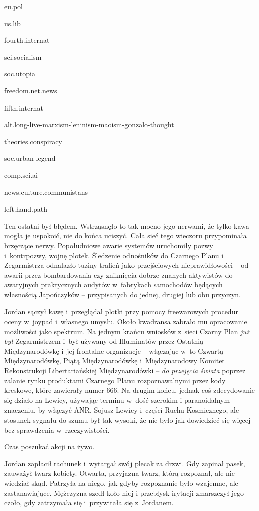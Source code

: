 \documentclass[oneside,polish,11pt,sfheadings]{mwbk}
\begin{document}
eu.pol

us.lib

fourth.internat

sci.socialism

soc.utopia

freedom.net.news

fifth.internat

alt.long-live-marxism-leninism-maoism-gonzalo-thought

theories.conspiracy

soc.urban-legend

comp.sci.ai

news.culture.communistans

left.hand.path

Ten ostatni był błędem. Wstrząsnęło to tak mocno jego nerwami, że tylko
kawa mogła je uspokoić, nie do końca uciszyć. Cała sieć tego wieczoru
przypominała brzęczące nerwy. Popołudniowe awarie systemów uruchomiły
pozwy i~kontrpozwy, wojnę plotek. Śledzenie odnośników do Czarnego Planu
i Zegarmistrza odnalazło tuziny trafień jako przejściowych
nieprawidłowości -- od awarii przez bombardowania czy zniknięcia dobrze
znanych aktywistów do awaryjnych praktycznych audytów w~fabrykach
samochodów będących własnością Japończyków -- przypisanych do jednej,
drugiej lub obu przyczyn.

Jordan sączył kawę i~przeglądał plotki przy pomocy freewarowych procedur
oceny w~joypad i~własnego umysłu. Około kwadransa zabrało mu opracowanie
możliwości jako spektrum. Na jednym krańcu wniosków z~sieci Czarny Plan
\emph{już był} Zegarmistrzem i~był używany od Illuminatów przez Ostatnią
Międzynarodówkę i~jej frontalne organizacje -- włączając w~to Czwartą
Międzynarodówkę, Piątą Międzynarodówkę i~Międzynarodowy Komitet
Rekonstrukcji Libertariańskiej Międzynarodówki -- \emph{do przejęcia
świata} poprzez zalanie rynku produktami Czarnego Planu rozpoznawalnymi
przez kody kreskowe, które zawierały numer 666. Na drugim końcu, jednak
coś zdecydowanie się działo na Lewicy, używając terminu w~dość szerokim
i paranoidalnym znaczeniu, by włączyć ANR, Sojusz Lewicy i~części Ruchu
Kosmicznego, ale stosunek sygnału do szumu był tak wysoki, że nie było
jak dowiedzieć się więcej bez sprawdzenia w~rzeczywistości.

Czas poszukać akcji na żywo.

Jordan zapłacił rachunek i~wytargał swój plecak za drzwi. Gdy zapinał
pasek, zauważył twarz kobiety. Otwarta, przyjazna twarz, którą
rozpoznał, ale nie wiedział skąd. Patrzyła na niego, jak gdyby
rozpoznanie było wzajemne, ale zastanawiające. Mężczyzna szedł koło niej
i przebłysk irytacji zmarszczył jego czoło, gdy zatrzymała się i~przywitała się z~Jordanem.
\end{document}
